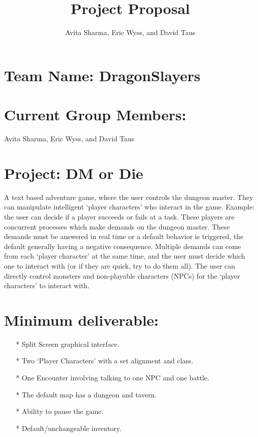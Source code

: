 \documentclass{article}
\author{Avita Sharma, Eric Wyss, and David Taus}
\title{\textbf{Project Proposal}}
\date{}
\theoremstyle{definition}
\begin{document}
\maketitle
\section*{Team Name: DragonSlayers}
\section*{Current Group Members:}
 Avita Sharma, Eric Wyss, and David Taus
\section*{Project: DM or Die}
A text based adventure game, where the user controls the dungeon master. They can 
manipulate intelligent `player characters' who interact in the game. Example: the
user can decide if a player succeeds or fails at a task. These players are 
concurrent processes which make demands on the dungeon master. These demands
must be answered in real time or a default behavior is triggered, the default
generally having a negative consequence. Multiple demands can come from each 
`player character' at the same time, and the user must decide which one to interact 
with (or if they are quick, try to do them all). The user can directly control
monsters and non-playable characters (NPCs) for the `player characters' to interact 
with.
\section*{Minimum deliverable:}
\begin{enumerate}
\item [*] Split Screen graphical interface.
\item [*] Two `Player Characters' with a set alignment and class.
\item [*] One Encounter involving talking to one NPC and one battle. 
\item [*] The default map has a dungeon and tavern.
\item [*] Ability to pause the game.
\item [*] Default/unchangeable inventory.
\end{enumerate}
\end{document}
